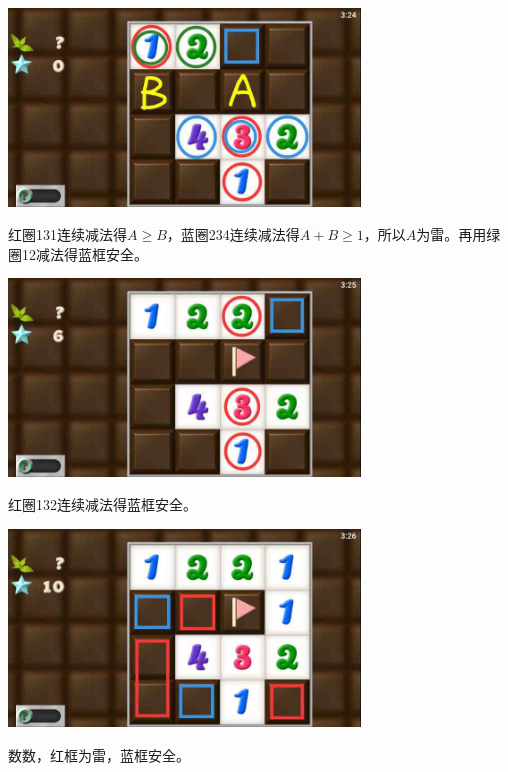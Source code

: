 \subsection{} %
\begin{center}
    \includegraphics[width=0.7\textwidth]{puzzlelow/157-1.jpg}
\end{center}
红圈131连续减法得$A\ge B$，蓝圈234连续减法得$A+B\ge 1$，所以$A$为雷。再用绿圈12减法得蓝框安全。
\begin{center}
    \includegraphics[width=0.7\textwidth]{puzzlelow/157-2.jpg}
\end{center}
红圈132连续减法得蓝框安全。
\begin{center}
    \includegraphics[width=0.7\textwidth]{puzzlelow/157-3.jpg}
\end{center}
数数，红框为雷，蓝框安全。

